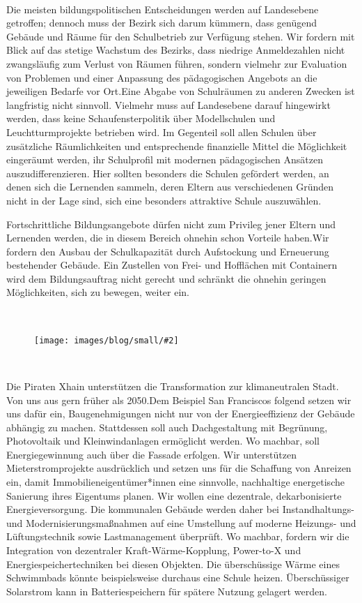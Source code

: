 \documentclass[a4paper,10pt]{article}
\newcommand{\mysection}[1]{{\vspace{1cm}\noindent\color{gray}{\ttfamily\LARGE\raggedright #1}\\\medskip}}
\newcommand{\abschnitt}[2]{%
\mysection{\raggedright #1}%
\begin{figure}[t]%
\vspace*{-2.7cm}%
\hspace*{-2.1cm}%
\texttt{[image: images/blog/small/\#2]} %
\end{figure}%
}
\newcommand{\bottomfigure}[1]{
\parbox{5cm}{
\vspace*{1cm}%
\texttt{[image: ./images/blog/small/\#1]}
}
}
\begin{document}


\mysection{Schule}

Die meisten bildungspolitischen Entscheidungen werden auf Landesebene
getroffen; dennoch muss der Bezirk sich darum kümmern, dass genügend
Gebäude und Räume für den Schulbetrieb zur Verfügung stehen. Wir fordern
mit Blick auf das stetige Wachstum des Bezirks, dass niedrige
Anmeldezahlen nicht zwangsläufig zum Verlust von Räumen führen, sondern
vielmehr zur Evaluation von Problemen und einer Anpassung des
pädagogischen Angebots an die jeweiligen Bedarfe vor Ort.Eine Abgabe von
Schulräumen zu anderen Zwecken ist langfristig nicht sinnvoll. Vielmehr
muss auf Landesebene darauf hingewirkt werden, dass keine
Schaufensterpolitik über Modellschulen und Leuchtturmprojekte betrieben
wird. Im Gegenteil soll allen Schulen über zusätzliche Räumlichkeiten
und entsprechende finanzielle Mittel die Möglichkeit eingeräumt werden,
ihr Schulprofil mit modernen pädagogischen Ansätzen auszudifferenzieren.
Hier sollten besonders die Schulen gefördert werden, an denen sich die
Lernenden sammeln, deren Eltern aus verschiedenen Gründen nicht in der
Lage sind, sich eine besonders attraktive Schule auszuwählen.

\clearpage
Fortschrittliche Bildungsangebote dürfen nicht zum Privileg jener Eltern
und Lernenden werden, die in diesem Bereich ohnehin schon Vorteile
haben.Wir fordern den Ausbau der Schulkapazität durch Aufstockung und
Erneuerung bestehender Gebäude. Ein Zustellen von Frei- und Hofflächen
mit Containern wird dem Bildungsauftrag nicht gerecht und schränkt die
ohnehin geringen Möglichkeiten, sich zu bewegen, weiter ein.

\abschnitt{}{establishment.png}
\mysection{Energiewende}
\vspace*{-1.5cm}

Die Piraten Xhain unterstützen die Transformation zur klimaneutralen
Stadt. Von uns aus gern früher als 2050.Dem Beispiel San Franciscos
folgend setzen wir uns dafür ein, Baugenehmigungen nicht nur von der
Energieeffizienz der Gebäude abhängig zu machen. Stattdessen soll auch
Dachgestaltung mit Begrünung, Photovoltaik und Kleinwindanlagen
ermöglicht werden. Wo machbar, soll Energiegewinnung auch über die
Fassade erfolgen. Wir unterstützen Mieterstromprojekte ausdrücklich und
setzen uns für die Schaffung von Anreizen ein, damit
Immobilieneigentümer*innen eine sinnvolle, nachhaltige energetische
Sanierung ihres Eigentums planen. Wir wollen eine dezentrale,
dekarbonisierte Energieversorgung. Die kommunalen Gebäude werden daher
bei Instandhaltungs- und Modernisierungsmaßnahmen auf eine Umstellung
auf moderne Heizungs- und Lüftungstechnik sowie Lastmanagement
überprüft. Wo machbar, fordern wir die Integration von dezentraler
Kraft-Wärme-Kopplung, Power-to-X und Energiespeichertechniken bei diesen
Objekten. Die überschüssige Wärme eines Schwimmbads könnte
beispielsweise durchaus eine Schule heizen. Überschüssiger Solarstrom
kann in Batteriespeichern für spätere Nutzung gelagert werden.
\end{document}
